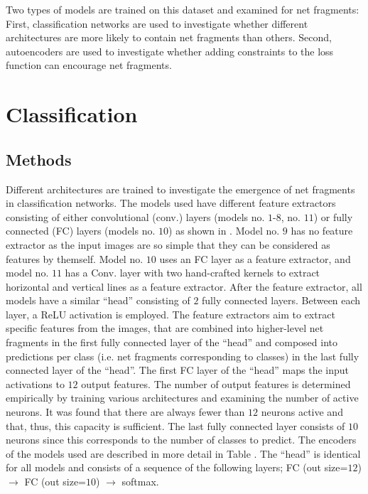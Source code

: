 Two types of models are trained on this dataset and examined for net fragments:
First, classification networks are used to investigate whether different architectures are more likely to contain net fragments than others.
Second, autoencoders are used to investigate whether adding constraints to the loss function can encourage net fragments.

\section{Classification}

\subsection{Methods}
Different architectures are trained to investigate the emergence of net fragments in classification networks.
The models used have different feature extractors consisting of either convolutional (conv.) layers (models no. $1$-$8$, no. $11$) or fully connected (FC) layers (models no. $10$) as shown in .
Model no. $9$ has no feature extractor as the input images are so simple that they can be considered as features by themself. Model no. $10$ uses an FC layer as a feature extractor, and model no. $11$ has a Conv. layer with two hand-crafted kernels to extract horizontal and vertical lines as a feature extractor.
After the feature extractor, all models have a similar ``head'' consisting of $2$ fully connected layers.
Between each layer, a ReLU activation is employed.
The feature extractors aim to extract specific features from the images, that are combined into higher-level net fragments in the first fully connected layer of the ``head'' and composed into predictions per class (i.e. net fragments corresponding to classes) in the last fully connected layer of the ``head''.
The first FC layer of the ``head'' maps the input activations to $12$ output features.
The number of output features is determined empirically by training various architectures and examining the number of active neurons.
It was found that there are always fewer than $12$ neurons active and that, thus, this capacity is sufficient.
The last fully connected layer consists of $10$ neurons since this corresponds to the number of classes to predict.
The encoders of the models used are described in more detail in Table .
The ``head'' is identical for all models and consists of a sequence of the following layers; FC (out size=$12$) $\rightarrow$ FC (out size=$10$) $\rightarrow$ softmax.


